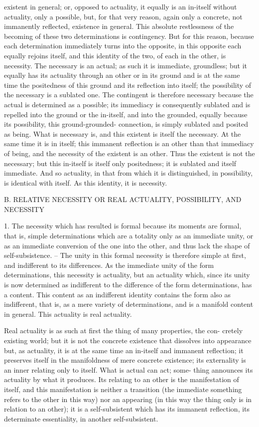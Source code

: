 existent in general; or, opposed to actuality, it equally is an in-itself without
actuality, only a possible, but, for that very reason, again only a concrete,
not immanently reflected, existence in general.
This absolute restlessness of the becoming of these two determinations is
contingency. But for this reason, because each determination immediately
turns into the opposite, in this opposite each equally rejoins itself, and this
identity of the two, of each in the other, is necessity.
The necessary is an actual; as such it is immediate, groundless; but it
equally has its actuality through an other or in its ground and is at the
same time the positedness of this ground and its reflection into itself; the
possibility of the necessary is a sublated one. The contingent is therefore
necessary because the actual is determined as a possible; its immediacy
is consequently sublated and is repelled into the ground or the in-itself,
and into the grounded, equally because its possibility, this ground-grounded-
connection, is simply sublated and posited as being. What is necessary is,
and this existent is itself the necessary. At the same time it is in itself; this
immanent reflection is an other than that immediacy of being, and the
necessity of the existent is an other. Thus the existent is not the necessary;
but this in-itself is itself only positedness; it is sublated and itself immediate.
And so actuality, in that from which it is distinguished, in possibility, is
identical with itself. As this identity, it is necessity.

B. RELATIVE NECESSITY OR REAL ACTUALITY, POSSIBILITY, AND NECESSITY

1. The necessity which has resulted is formal because its moments are formal,
that is, simple determinations which are a totality only as an immediate
unity, or as an immediate conversion of the one into the other, and thus
lack the shape of self-subsistence. – The unity in this formal necessity is
therefore simple at first, and indifferent to its differences. As the immediate
unity of the form determinations, this necessity is actuality, but an actuality
which, since its unity is now determined as indifferent to the difference of
the form determinations, has a content. This content as an indifferent
identity contains the form also as indifferent, that is, as a mere variety of
determinations, and is a manifold content in general. This actuality is real
actuality.

Real actuality is as such at first the thing of many properties, the con-
cretely existing world; but it is not the concrete existence that dissolves into
appearance but, as actuality, it is at the same time an in-itself and immanent
reflection; it preserves itself in the manifoldness of mere concrete existence;
its externality is an inner relating only to itself. What is actual can act; some-
thing announces its actuality by what it produces. Its relating to an other
is the manifestation of itself, and this manifestation is neither a transition
(the immediate something refers to the other in this way) nor an appearing
(in this way the thing only is in relation to an other); it is a self-subsistent
which has its immanent reflection, its determinate essentiality, in another
self-subsistent.

